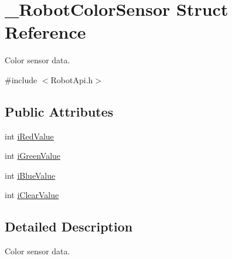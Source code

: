 \hypertarget{struct__RobotColorSensor}{\section{\+\_\+\+Robot\+Color\+Sensor Struct Reference}
\label{struct__RobotColorSensor}
}


Color sensor data.  




{\ttfamily \#include $<$Robot\+Api.\+h$>$}

\subsection*{Public Attributes}
\begin{DoxyCompactItemize}
\item 
int \hyperlink{struct__RobotColorSensor_a38b270be1ee87849b7469d100e335314}{i\+Red\+Value}
\item 
int \hyperlink{struct__RobotColorSensor_acfeb66d972f8c3ab2a5982fd4aa3f630}{i\+Green\+Value}
\item 
int \hyperlink{struct__RobotColorSensor_ad5c72e4e33a2447d6514d1d5a13dc036}{i\+Blue\+Value}
\item 
int \hyperlink{struct__RobotColorSensor_afc18a2ae43409d1b74340f6f9d9fb677}{i\+Clear\+Value}
\end{DoxyCompactItemize}


\subsection{Detailed Description}
Color sensor data. 

